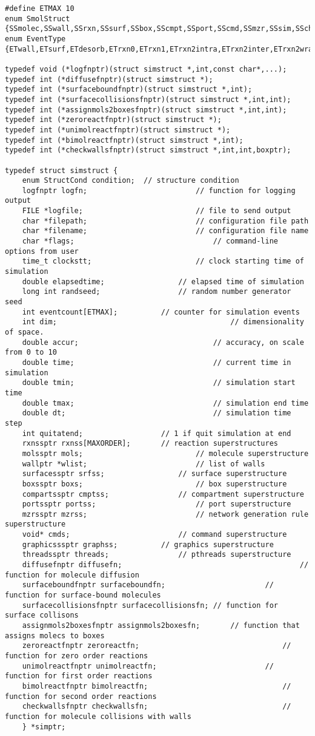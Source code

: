 \documentclass {scrbook}
\begin{document}
\begin{lstlisting}
#define ETMAX 10
enum SmolStruct {SSmolec,SSwall,SSrxn,SSsurf,SSbox,SScmpt,SSport,SScmd,SSmzr,SSsim,SScheck,SSall,SSnone};
enum EventType {ETwall,ETsurf,ETdesorb,ETrxn0,ETrxn1,ETrxn2intra,ETrxn2inter,ETrxn2wrap,ETimport,ETexport};

typedef void (*logfnptr)(struct simstruct *,int,const char*,...);
typedef int (*diffusefnptr)(struct simstruct *);
typedef int (*surfaceboundfnptr)(struct simstruct *,int);
typedef int (*surfacecollisionsfnptr)(struct simstruct *,int,int);
typedef int (*assignmols2boxesfnptr)(struct simstruct *,int,int);
typedef int (*zeroreactfnptr)(struct simstruct *);
typedef int (*unimolreactfnptr)(struct simstruct *);
typedef int (*bimolreactfnptr)(struct simstruct *,int);
typedef int (*checkwallsfnptr)(struct simstruct *,int,int,boxptr);

typedef struct simstruct {
	enum StructCond condition;	// structure condition
	logfnptr logfn;							// function for logging output
	FILE *logfile;							// file to send output
	char *filepath;							// configuration file path
	char *filename;							// configuration file name
	char *flags;								// command-line options from user
	time_t clockstt;						// clock starting time of simulation
	double elapsedtime;					// elapsed time of simulation
	long int randseed;					// random number generator seed
	int eventcount[ETMAX];			// counter for simulation events
	int dim;										// dimensionality of space.
	double accur;								// accuracy, on scale from 0 to 10
	double time;								// current time in simulation
	double tmin;								// simulation start time
	double tmax;								// simulation end time
	double dt;									// simulation time step
	int quitatend;					// 1 if quit simulation at end
	rxnssptr rxnss[MAXORDER];		// reaction superstructures
	molssptr mols;							// molecule superstructure
	wallptr *wlist;							// list of walls
	surfacessptr srfss;					// surface superstructure
	boxssptr boxs;							// box superstructure
	compartssptr cmptss;				// compartment superstructure
	portssptr portss;						// port superstructure
	mzrssptr mzrss;							// network generation rule superstructure
	void* cmds;							// command superstructure
	graphicsssptr graphss;			// graphics superstructure
	threadssptr threads;				// pthreads superstructure
	diffusefnptr diffusefn;											// function for molecule diffusion
	surfaceboundfnptr surfaceboundfn;						// function for surface-bound molecules
	surfacecollisionsfnptr surfacecollisionsfn; // function for surface collisons
	assignmols2boxesfnptr assignmols2boxesfn;		// function that assigns molecs to boxes
	zeroreactfnptr zeroreactfn;									// function for zero order reactions
	unimolreactfnptr unimolreactfn;							// function for first order reactions
	bimolreactfnptr bimolreactfn;								// function for second order reactions
	checkwallsfnptr checkwallsfn;								// function for molecule collisions with walls
	} *simptr;
\end{lstlisting}
\end{document}
